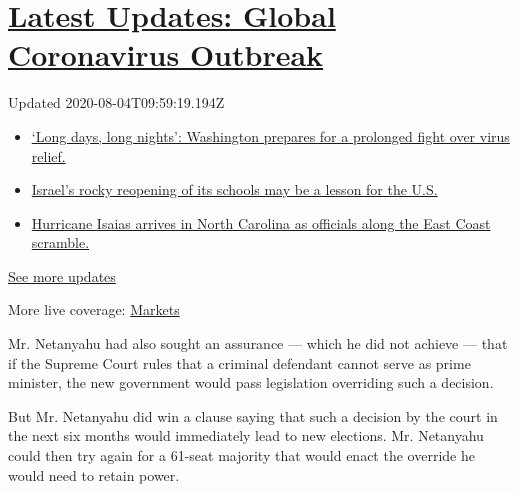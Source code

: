 \hypertarget{latest-updates-global-coronavirus-outbreak}{%
\section{\texorpdfstring{\href{https://www.nytimes.com/2020/08/04/world/coronavirus-covid-19.html?action=click\&pgtype=Article\&state=default\&region=MAIN_CONTENT_1\&context=storylines_live_updates}{Latest
Updates: Global Coronavirus
Outbreak}}{Latest Updates: Global Coronavirus Outbreak}}\label{latest-updates-global-coronavirus-outbreak}}

Updated 2020-08-04T09:59:19.194Z

\begin{itemize}
\tightlist
\item
  \href{https://www.nytimes.com/2020/08/04/world/coronavirus-covid-19.html?action=click\&pgtype=Article\&state=default\&region=MAIN_CONTENT_1\&context=storylines_live_updates\#link-6b644638}{`Long
  days, long nights': Washington prepares for a prolonged fight over
  virus relief.}
\item
  \href{https://www.nytimes.com/2020/08/04/world/coronavirus-covid-19.html?action=click\&pgtype=Article\&state=default\&region=MAIN_CONTENT_1\&context=storylines_live_updates\#link-7af9fca0}{Israel's
  rocky reopening of its schools may be a lesson for the U.S.}
\item
  \href{https://www.nytimes.com/2020/08/04/world/coronavirus-covid-19.html?action=click\&pgtype=Article\&state=default\&region=MAIN_CONTENT_1\&context=storylines_live_updates\#link-33bf9168}{Hurricane
  Isaias arrives in North Carolina as officials along the East Coast
  scramble.}
\end{itemize}

\href{https://www.nytimes.com/2020/08/04/world/coronavirus-covid-19.html?action=click\&pgtype=Article\&state=default\&region=MAIN_CONTENT_1\&context=storylines_live_updates}{See
more updates}

More live coverage:
\href{https://www.nytimes.com/live/2020/08/03/business/stock-market-today-coronavirus?action=click\&pgtype=Article\&state=default\&region=MAIN_CONTENT_1\&context=storylines_live_updates}{Markets}

Mr. Netanyahu had also sought an assurance --- which he did not achieve
--- that if the Supreme Court rules that a criminal defendant cannot
serve as prime minister, the new government would pass legislation
overriding such a decision.

But Mr. Netanyahu did win a clause saying that such a decision by the
court in the next six months would immediately lead to new elections.
Mr. Netanyahu could then try again for a 61-seat majority that would
enact the override he would need to retain power.

